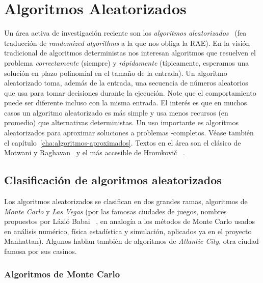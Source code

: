 

\chapter{Algoritmos Aleatorizados}
\label{cha:randomized-algorithms}

  Un área activa de investigación reciente
  son los \emph{algoritmos aleatorizados}~%
    \cite{karp91:_intro_randomized_algorithms,
          motwani96:_randomized_algor}
  (fea traducción de \emph{\foreignlanguage{english}{randomized algorithms}}
   a la que nos obliga la RAE).
  En la visión tradicional de algoritmos deterministas
  nos interesan algoritmos que resuelven el problema \emph{correctamente}
  (siempre)
  y \emph{rápidamente}
  (típicamente,
   esperamos una solución en plazo polinomial en el tamaño de la entrada).
  Un algoritmo aleatorizado toma,
  además de la entrada,
  una secuencia de números aleatorios
  que usa para tomar decisiones durante la ejecución.
  Note que el comportamiento puede ser diferente
  incluso con la misma entrada.
  El interés es que en muchos casos un algoritmo aleatorizado
  es más simple
  y usa menos recursos
  (en promedio)
  que alternativas deterministas.
  Un uso importante es algoritmos aleatorizados
  para aproximar soluciones
  a problemas \NP\nobreakdash-completos.
  Véase también el capítulo~\ref{cha:algoritmos-aproximados}.
  Textos en el área son el clásico de Motwani y Raghavan~%
    \cite{motwani95:_randomized_algorithms}
  y el más accesible de Hromkovič~%
    \cite{hromkovic05:_design_anal_randomized_algor}.

\section{Clasificación de algoritmos aleatorizados}
\label{sec:clasificacion-aleatorizados}

  Los algoritmos aleatorizados se clasifican en dos grandes ramas,
  algoritmos de \emph{Monte Carlo} y \emph{Las Vegas}
  (por las famosas ciudades de juegos,
   nombres propuestos por Lázló Babai~%
     \cite{babai79:_monte_carlo_algo_graph_isomorph_test},
   en analogía a los métodos de Monte Carlo usados en análisis numérico,
   física estadística y simulación,
   aplicados ya en el proyecto Manhattan).
  Algunos hablan también de algoritmos de \emph{Atlantic City},
  otra ciudad famosa por sus casinos.

\subsection{Algoritmos de Monte Carlo}
\label{sec:algoritmos-monte-carlo}

